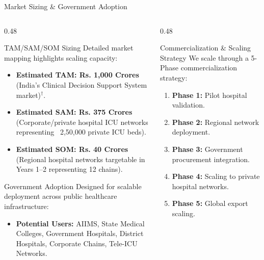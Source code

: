 \documentclass[aspectratio=169, 11pt]{beamer}
\begin{document}
\begin{frame}{Market Sizing \& Government Adoption}
    \begin{columns}[t]
        \begin{column}{0.48\textwidth}
            \begin{block}{\textcolor{neonCyan}{TAM/SAM/SOM Sizing}}
                \scriptsize
                Detailed market mapping highlights scaling capacity:
                \begin{itemize}
                    \item \textbf{Estimated TAM: Rs. 1,000 Crores} (India's Clinical Decision Support System market)$^\dagger$.
                    \item \textbf{Estimated SAM: Rs. 375 Crores} (Corporate/private hospital ICU networks representing ~2,50,000 private ICU beds).
                    \item \textbf{Estimated SOM: Rs. 40 Crores} (Regional hospital networks targetable in Years 1--2 representing 12 chains).
                \end{itemize}
            \end{block}
            
            \begin{block}{\textcolor{neonTeal}{Government Adoption}}
                \scriptsize
                Designed for scalable deployment across public healthcare infrastructure:
                \begin{itemize}
                    \item \textbf{Potential Users:} AIIMS, State Medical Colleges, Government Hospitals, District Hospitals, Corporate Chains, Tele-ICU Networks.
                \end{itemize}
            \end{block}
        \end{column}
        
        \begin{column}{0.48\textwidth}
            \begin{block}{\textcolor{neonAmber}{Commercialization \& Scaling Strategy}}
                \scriptsize
                We scale through a 5-Phase commercialization strategy:
                \begin{enumerate}
                    \item \textbf{Phase 1:} Pilot hospital validation.
                    \item \textbf{Phase 2:} Regional network deployment.
                    \item \textbf{Phase 3:} Government procurement integration.
                    \item \textbf{Phase 4:} Scaling to private hospital networks.
                    \item \textbf{Phase 5:} Global export scaling.
                \end{enumerate}
            \end{block}
        \end{column}
    \end{columns}
\end{frame}
\end{document}
